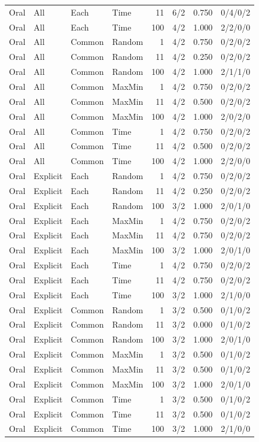 \begin{longtable}{llllrrcc}
Oral & All & Each & Time & 11 & 6/2 & 0.750 & 0/4/0/2 \\
Oral & All & Each & Time & 100 & 4/2 & 1.000 & 2/2/0/0 \\
Oral & All & Common & Random & 1 & 4/2 & 0.750 & 0/2/0/2 \\
Oral & All & Common & Random & 11 & 4/2 & 0.250 & 0/2/0/2 \\
Oral & All & Common & Random & 100 & 4/2 & 1.000 & 2/1/1/0 \\
Oral & All & Common & MaxMin & 1 & 4/2 & 0.750 & 0/2/0/2 \\
Oral & All & Common & MaxMin & 11 & 4/2 & 0.500 & 0/2/0/2 \\
Oral & All & Common & MaxMin & 100 & 4/2 & 1.000 & 2/0/2/0 \\
Oral & All & Common & Time & 1 & 4/2 & 0.750 & 0/2/0/2 \\
Oral & All & Common & Time & 11 & 4/2 & 0.500 & 0/2/0/2 \\
Oral & All & Common & Time & 100 & 4/2 & 1.000 & 2/2/0/0 \\
Oral & Explicit & Each & Random & 1 & 4/2 & 0.750 & 0/2/0/2 \\
Oral & Explicit & Each & Random & 11 & 4/2 & 0.250 & 0/2/0/2 \\
Oral & Explicit & Each & Random & 100 & 3/2 & 1.000 & 2/0/1/0 \\
Oral & Explicit & Each & MaxMin & 1 & 4/2 & 0.750 & 0/2/0/2 \\
Oral & Explicit & Each & MaxMin & 11 & 4/2 & 0.750 & 0/2/0/2 \\
Oral & Explicit & Each & MaxMin & 100 & 3/2 & 1.000 & 2/0/1/0 \\
Oral & Explicit & Each & Time & 1 & 4/2 & 0.750 & 0/2/0/2 \\
Oral & Explicit & Each & Time & 11 & 4/2 & 0.750 & 0/2/0/2 \\
Oral & Explicit & Each & Time & 100 & 3/2 & 1.000 & 2/1/0/0 \\
Oral & Explicit & Common & Random & 1 & 3/2 & 0.500 & 0/1/0/2 \\
Oral & Explicit & Common & Random & 11 & 3/2 & 0.000 & 0/1/0/2 \\
Oral & Explicit & Common & Random & 100 & 3/2 & 1.000 & 2/0/1/0 \\
Oral & Explicit & Common & MaxMin & 1 & 3/2 & 0.500 & 0/1/0/2 \\
Oral & Explicit & Common & MaxMin & 11 & 3/2 & 0.500 & 0/1/0/2 \\
Oral & Explicit & Common & MaxMin & 100 & 3/2 & 1.000 & 2/0/1/0 \\
Oral & Explicit & Common & Time & 1 & 3/2 & 0.500 & 0/1/0/2 \\
Oral & Explicit & Common & Time & 11 & 3/2 & 0.500 & 0/1/0/2 \\
Oral & Explicit & Common & Time & 100 & 3/2 & 1.000 & 2/1/0/0 \\

\end{longtable}\endgroup
